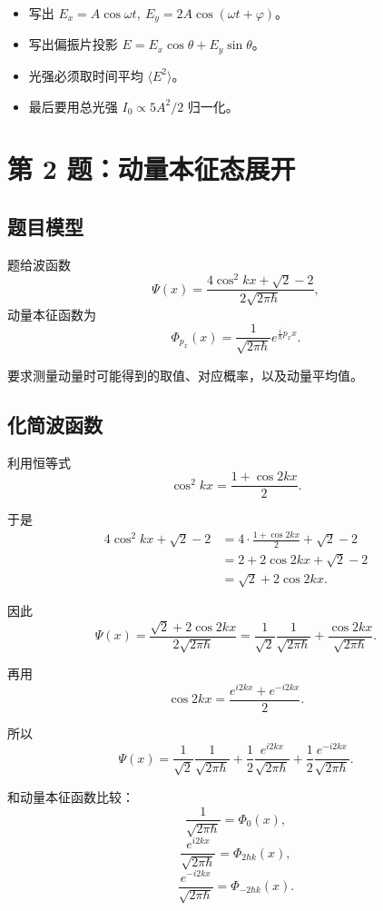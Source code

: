 \documentclass[12pt,a4paper]{ctexart}
\begin{document}
\begin{itemize}
  \item 写出 $E_x=A\cos\omega t,\ E_y=2A\cos(\omega t+\varphi)$。
  \item 写出偏振片投影 $E=E_x\cos\theta+E_y\sin\theta$。
  \item 光强必须取时间平均 $\langle E^2\rangle$。
  \item 最后要用总光强 $I_0\propto 5A^2/2$ 归一化。
\end{itemize}

\section*{第 2 题：动量本征态展开}

\subsection*{题目模型}

题给波函数
\[
\Psi(x)=\frac{4\cos^2kx+\sqrt{2}-2}{2\sqrt{2\pi\hbar}},
\]
动量本征函数为
\[
\Phi_{p_x}(x)=\frac{1}{\sqrt{2\pi\hbar}}e^{\frac{i}{\hbar}p_xx}.
\]

要求测量动量时可能得到的取值、对应概率，以及动量平均值。

\subsection*{化简波函数}

利用恒等式
\[
\cos^2kx=\frac{1+\cos2kx}{2}.
\]

于是
\[
\begin{aligned}
4\cos^2kx+\sqrt{2}-2
&=4\cdot\frac{1+\cos2kx}{2}+\sqrt{2}-2\\
&=2+2\cos2kx+\sqrt{2}-2\\
&=\sqrt{2}+2\cos2kx.
\end{aligned}
\]

因此
\[
\Psi(x)=\frac{\sqrt{2}+2\cos2kx}{2\sqrt{2\pi\hbar}}
=\frac{1}{\sqrt{2}}\frac{1}{\sqrt{2\pi\hbar}}
+\frac{\cos2kx}{\sqrt{2\pi\hbar}}.
\]

再用
\[
\cos2kx=\frac{e^{i2kx}+e^{-i2kx}}{2}.
\]

所以
\[
\Psi(x)
=\frac{1}{\sqrt{2}}\frac{1}{\sqrt{2\pi\hbar}}
+\frac{1}{2}\frac{e^{i2kx}}{\sqrt{2\pi\hbar}}
+\frac{1}{2}\frac{e^{-i2kx}}{\sqrt{2\pi\hbar}}.
\]

和动量本征函数比较：
\[
\frac{1}{\sqrt{2\pi\hbar}}=\Phi_0(x),
\]
\[
\frac{e^{i2kx}}{\sqrt{2\pi\hbar}}=\Phi_{2\hbar k}(x),
\]
\[
\frac{e^{-i2kx}}{\sqrt{2\pi\hbar}}=\Phi_{-2\hbar k}(x).
\]
\end{document}
